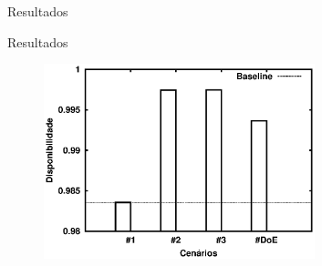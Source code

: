 \documentclass{beamer}
\begin{document}
\begin{frame}{Resultados}
        \begin{figure}
            \centering
        \end{figure}

    \end{frame}
    
    \begin{frame}{Resultados}

        \begin{figure}[ht]
            \includegraphics[width=0.70\textwidth]{img/disp-4-cenarios.eps}
        \end{figure}

    \end{frame}
      
\end{document}
